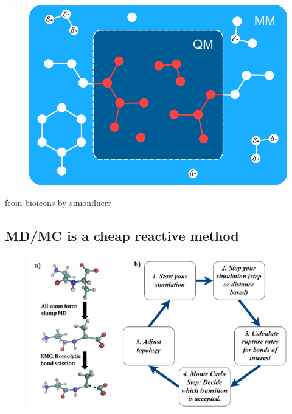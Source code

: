 \documentclass[
  letterpaper,
  DIV=11,
  numbers=noendperiod]{scrartcl}
\begin{document}
\begin{figure}

{\centering \includegraphics{www/qmmm.svg}

}

\end{figure}

from bioicons by simonduerr

\hypertarget{mdmc-is-a-cheap-reactive-method}{%
\subsection{MD/MC is a cheap reactive
method}\label{mdmc-is-a-cheap-reactive-method}}

\begin{figure}

{\centering \includegraphics{www/KIMMDY_cycle.png}

}

\end{figure}
\end{document}
